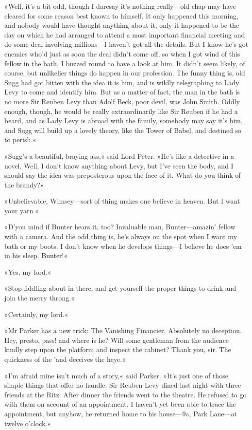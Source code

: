 »Well, it's a bit odd, though I daresay it's nothing really—old chap may have cleared for some reason best known to himself. It only happened this morning, and nobody would have thought anything about it, only it happened to be the day on which he had arranged to attend a most important financial meeting and do some deal involving millions—I haven't got all the details. But I know he's got enemies who'd just as soon the deal didn't come off, so when I got wind of this fellow in the bath, I buzzed round to have a look at him. It didn't seem likely, of course, but unlikelier things do happen in our profession. The funny thing is, old Sugg had got bitten with the idea it is him, and is wildly telegraphing to Lady Levy to come and identify him. But as a matter of fact, the man in the bath is no more Sir Reuben Levy than Adolf Beck, poor devil, was John Smith. Oddly enough, though, he would be really extraordinarily like Sir Reuben if he had a beard, and as Lady Levy is abroad with the family, somebody may say it's him, and Sugg will build up a lovely theory, like the Tower of Babel, and destined so to perish.«

»Sugg's a beautiful, braying ass,« said Lord Peter. »He's like a detective in a novel. Well, I don't know anything about Levy, but I've seen the body, and I should say the idea was preposterous upon the face of it. What do you think of the brandy?«

»Unbelievable, Wimsey—sort of thing makes one believe in heaven. But I want your yarn.«

»D'you mind if Bunter hears it, too? Invaluable man, Bunter—amazin' fellow with a camera. And the odd thing is, he's always on the spot when I want my bath or my boots. I don't know when he develops things—I believe he does 'em in his sleep. Bunter!«

»Yes, my lord.«

»Stop fiddling about in there, and get yourself the proper things to drink and join the merry throng.«

»Certainly, my lord.«

»Mr Parker has a new trick: The Vanishing Financier. Absolutely no deception. Hey, presto, pass! and where is he? Will some gentleman from the audience kindly step upon the platform and inspect the cabinet? Thank you, sir. The quickness of the 'and deceives the heye.«

»I'm afraid mine isn't much of a story,« said Parker. »It's just one of those simple things that offer no handle. Sir Reuben Levy dined last night with three friends at the Ritz. After dinner the friends went to the theatre. He refused to go with them on account of an appointment. I haven't yet been able to trace the appointment, but anyhow, he returned home to his house—9a, Park Lane—at twelve o'clock.«

